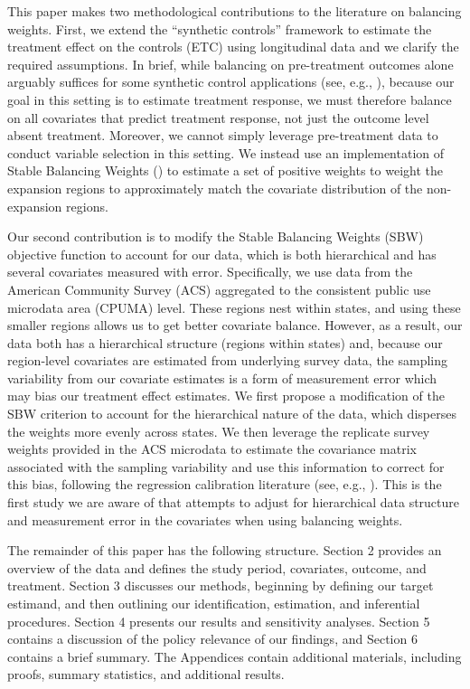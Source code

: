 \documentclass[aoas]{imsart}
\theoremstyle{plain}
\theoremstyle{remark}
\begin{document}
This paper makes two methodological contributions to the literature on balancing weights. First, we extend the ``synthetic controls'' framework to estimate the treatment effect on the controls (ETC) using longitudinal data and we clarify the required assumptions. In brief, while balancing on pre-treatment outcomes alone arguably suffices for some synthetic control applications (see, e.g., \cite{botosaru2017role}), because our goal in this setting is to estimate treatment response, we must therefore balance on all covariates that predict treatment response, not just the outcome level absent treatment. Moreover, we cannot simply leverage pre-treatment data to conduct variable selection in this setting. We instead use an implementation of Stable Balancing Weights (\cite{zubizarreta2015stable}) to estimate a set of positive weights to weight the expansion regions to approximately match the covariate distribution of the non-expansion regions. 

Our second contribution is to modify the Stable Balancing Weights (SBW) objective function to account for our data, which is both hierarchical and has several covariates measured with error. Specifically, we use data from the American Community Survey (ACS) aggregated to the consistent public use microdata area (CPUMA) level. These regions nest within states, and using these smaller regions allows us to get better covariate balance. However, as a result, our data both has a hierarchical structure (regions within states) and, because our region-level covariates are estimated from underlying survey data, the sampling variability from our covariate estimates is a form of measurement error which may bias our treatment effect estimates. We first propose a modification of the SBW criterion to account for the hierarchical nature of the data, which disperses the weights more evenly across states. We then leverage the replicate survey weights provided in the ACS microdata to estimate the covariance matrix associated with the sampling variability and use this information to correct for this bias, following the regression calibration literature (see, e.g., \cite{gleser1992importance}). This is the first study we are aware of that attempts to adjust for hierarchical data structure and measurement error in the covariates when using balancing weights. 

The remainder of this paper has the following structure. Section 2 provides an overview of the data and defines the study period, covariates, outcome, and treatment. Section 3 discusses our methods, beginning by defining our target estimand, and then outlining our identification, estimation, and inferential procedures. Section 4 presents our results and sensitivity analyses. Section 5 contains a discussion of the policy relevance of our findings, and Section 6 contains a brief summary. The Appendices contain additional materials, including proofs, summary statistics, and additional results.
\end{document}
